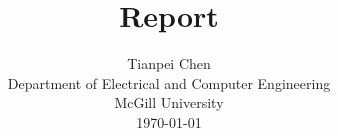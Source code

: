 \documentclass[12pt, draftclsnofoot, onecolumn]{IEEEtran}
\begin{document}
\begin{spacing}{2}
%
\title{Report}

%
%
%
\author{Tianpei Chen\\
Department of Electrical and Computer Engineering\\
McGill University\\
\today}


% 
%




\end{spacing}
\end{document}
